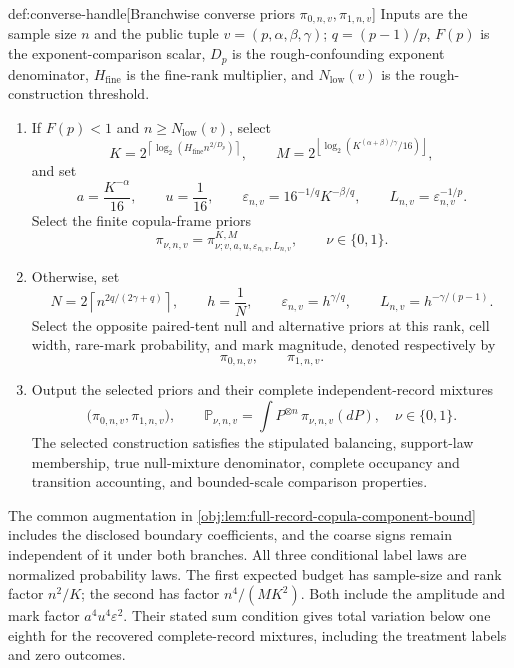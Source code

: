 \documentclass[11pt]{article}
\begin{document}
\begin{algorithmv}{def:converse-handle}[Branchwise converse priors \(\pi_{0,n,v},\pi_{1,n,v}\)]
Inputs are the sample size \(n\) and the public tuple \(v=(p,\alpha,\beta,\gamma)\); \(q=(p-1)/p\), \(F(p)\) is the exponent-comparison scalar, \(D_p\) is the rough-confounding exponent denominator, \(H_{\mathrm{fine}}\) is the fine-rank multiplier, and \(N_{\mathrm{low}}(v)\) is the rough-construction threshold.
\begin{enumerate}
\item If \(F(p)<1\) and \(n\ge N_{\mathrm{low}}(v)\), select
\[
K=2^{\left\lceil\log_2\!\left(H_{\mathrm{fine}}n^{2/D_p}\right)\right\rceil},
\qquad
M=2^{\left\lfloor\log_2\!\left(K^{(\alpha+\beta)/\gamma}/16\right)\right\rfloor},
\]
and set
\[
a=\frac{K^{-\alpha}}{16},
\qquad
u=\frac1{16},
\qquad
\varepsilon_{n,v}=16^{-1/q}K^{-\beta/q},
\qquad
L_{n,v}=\varepsilon_{n,v}^{-1/p}.
\]
Select the finite copula-frame priors
\[
\pi_{\nu,n,v}
=
\pi^{K,M}_{\nu;v,a,u,\varepsilon_{n,v},L_{n,v}},
\qquad \nu\in\{0,1\}.
\]
\item Otherwise, set
\[
N=2\left\lceil n^{2q/(2\gamma+q)}\right\rceil,
\qquad
h=\frac1N,
\qquad
\varepsilon_{n,v}=h^{\gamma/q},
\qquad
L_{n,v}=h^{-\gamma/(p-1)}.
\]
Select the opposite paired-tent null and alternative priors at this rank, cell width, rare-mark probability, and mark magnitude, denoted respectively by
\[
\pi_{0,n,v},\qquad \pi_{1,n,v}.
\]
\item Output the selected priors and their complete independent-record mixtures
\[
\bigl(\pi_{0,n,v},\pi_{1,n,v}\bigr),
\qquad
\mathbb P_{\nu,n,v}
=
\int P^{\otimes n}\,\pi_{\nu,n,v}(dP),
\quad \nu\in\{0,1\}.
\]
The selected construction satisfies the stipulated balancing, support-law membership, true null-mixture denominator, complete occupancy and transition accounting, and bounded-scale comparison properties.
\end{enumerate}
\end{algorithmv}

The common augmentation in \cref{obj:lem:full-record-copula-component-bound} includes the disclosed boundary coefficients, and the coarse signs remain independent of it under both branches. All three conditional label laws are normalized probability laws. The first expected budget has sample-size and rank factor \(n^2/K\); the second has factor \(n^4/(MK^2)\). Both include the amplitude and mark factor \(a^4u^4\varepsilon^2\). Their stated sum condition gives total variation below one eighth for the recovered complete-record mixtures, including the treatment labels and zero outcomes.
\end{document}
